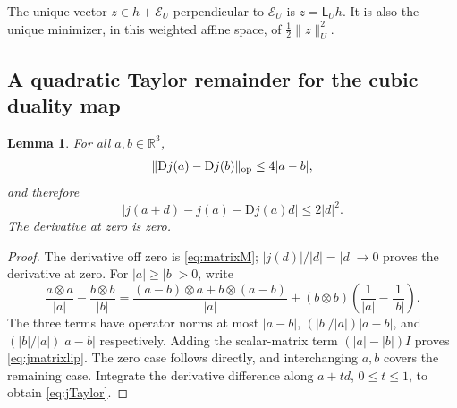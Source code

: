 \documentclass[11pt,a4paper]{article}
\newtheorem{lemma}[theorem]{Lemma}
\theoremstyle{definition}\newtheorem{definition}[theorem]{Definition}
\theoremstyle{remark}\newtheorem{remark}[theorem]{Remark}
\newcommand{\R}{\mathbb R}
\newcommand{\GG}{\mathcal E}
\newcommand{\LP}{\mathsf L}
\newcommand{\norm}[1]{\lVert #1\rVert}
\numberwithin{equation}{section}
\begin{document}
The unique vector $z\in h+\GG_U$ perpendicular to $\GG_U$ is $z=\LP_Uh$. It is also the unique minimizer, in this weighted affine space, of $\frac12\norm z_U^2$.

\subsection{A quadratic Taylor remainder for the cubic duality map}
\begin{lemma}\label{lem:jTaylor}
For all $a,b\in\R^3$,
\begin{equation}\label{eq:jmatrixlip}
 \norm{\mathrm Dj(a)-\mathrm Dj(b)}_{\rm op}\le4|a-b|,
\end{equation}
and therefore
\begin{equation}\label{eq:jTaylor}
 |j(a+d)-j(a)-\mathrm Dj(a)d|\le2|d|^2.
\end{equation}
The derivative at zero is zero.
\end{lemma}
\begin{proof}
The derivative off zero is \eqref{eq:matrixM}; $|j(d)|/|d|=|d|\to0$ proves the derivative at zero. For $|a|\ge|b|>0$, write
\[
 \frac{a\otimes a}{|a|}-\frac{b\otimes b}{|b|}
 =\frac{(a-b)\otimes a+b\otimes(a-b)}{|a|}
  +(b\otimes b)\left(\frac1{|a|}-\frac1{|b|}\right).
\]
The three terms have operator norms at most
$|a-b|$, $(|b|/|a|)|a-b|$, and $(|b|/|a|)|a-b|$ respectively. Adding the scalar-matrix term $(|a|-|b|)I$ proves \eqref{eq:jmatrixlip}. The zero case follows directly, and interchanging $a,b$ covers the remaining case. Integrate the derivative difference along $a+td$, $0\le t\le1$, to obtain \eqref{eq:jTaylor}.
\end{proof}
\end{document}
